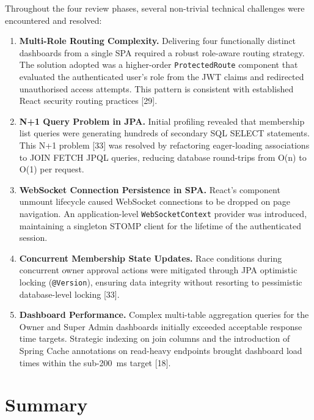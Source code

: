 \documentclass[
  12pt,
  a4paperpaper,
]{report}
\begin{document}
Throughout the four review phases, several non-trivial technical
challenges were encountered and resolved:

\begin{enumerate}
\def\labelenumi{\arabic{enumi}.}

\item \textbf{Multi-Role Routing Complexity.} Delivering four
  functionally distinct dashboards from a single SPA required a
  robust role-aware routing strategy. The solution adopted was a
  higher-order \texttt{ProtectedRoute} component that evaluated the
  authenticated user's role from the JWT claims and redirected
  unauthorised access attempts. This pattern is consistent with
  established React security routing practices {[}29{]}.

\item \textbf{N+1 Query Problem in JPA.} Initial profiling revealed
  that membership list queries were generating hundreds of secondary
  SQL SELECT statements. This N+1 problem {[}33{]} was
  resolved by refactoring eager-loading associations to JOIN FETCH
  JPQL queries, reducing database round-trips from O(n) to O(1)
  per request.

\item \textbf{WebSocket Connection Persistence in SPA.} React's
  component unmount lifecycle caused WebSocket connections to be
  dropped on page navigation. An application-level
  \texttt{WebSocketContext} provider was introduced, maintaining a
  singleton STOMP client for the lifetime of the authenticated
  session.

\item \textbf{Concurrent Membership State Updates.} Race conditions
  during concurrent owner approval actions were mitigated through
  JPA optimistic locking (\texttt{@Version}), ensuring data
  integrity without resorting to pessimistic database-level locking
  {[}33{]}.

\item \textbf{Dashboard Performance.} Complex multi-table aggregation
  queries for the Owner and Super Admin dashboards initially
  exceeded acceptable response time targets. Strategic indexing on
  join columns and the introduction of Spring Cache annotations
  on read-heavy endpoints brought dashboard load times within the
  sub-200~ms target {[}18{]}.

\end{enumerate}


\section*{Summary}\label{lit-summary}
\end{document}
